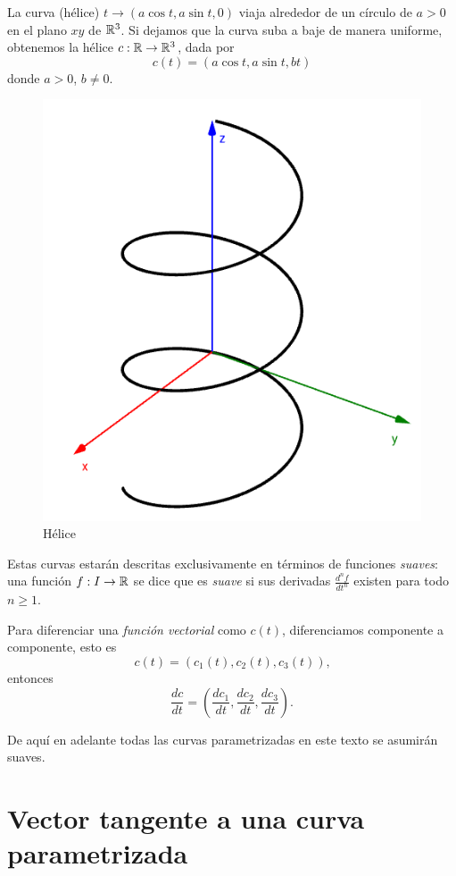 \begin{example}
    La curva (hélice) $t \rightarrow (a\cos{t},a\sin{t},0)$ viaja alrededor de un círculo de 
    $a > 0$ en el plano $xy$ de $\mathbb{R}^{3}$. Si dejamos que la curva suba a baje de manera
    uniforme, obtenemos la hélice $c:\mathbb{R} \rightarrow \mathbb{R}^{3}$, dada por
    $$ c(t) = (a\cos{t}, a\sin{t}, bt) $$
    donde $a>0$, $b \ne 0$.
\end{example}

\begin{figure}[!ht]
  \begin{center}
      \includegraphics[width=0.6\linewidth]{gfx/helice}
      \caption{Hélice}
      \label{fig:boat1}
  \end{center}
\end{figure}

Estas curvas estar\'an descritas exclusivamente en t\'erminos de funciones \emph{suaves}: una funci\'on
$f:I \rightarrow \mathbb{R}$ se dice que es \emph{suave} si sus derivadas $\frac{d^{n}f}{dt^{n}}$
existen para todo $n \ge 1$.

Para diferenciar una \emph{funci\'on vectorial} como $c(t)$, diferenciamos componente a componente, esto es
$$ c(t) = (c_{1}(t),c_{2}(t),c_{3}(t))\text{,}$$
entonces
$$ \frac{dc}{dt} = \left( \frac{dc_{1}}{dt},\frac{dc_{2}}{dt},\frac{dc_{3}}{dt}\right)\text{.}$$

De aqu\'i en adelante todas las curvas parametrizadas en este texto se asumir\'an suaves.

\section{Vector tangente a una curva parametrizada}

